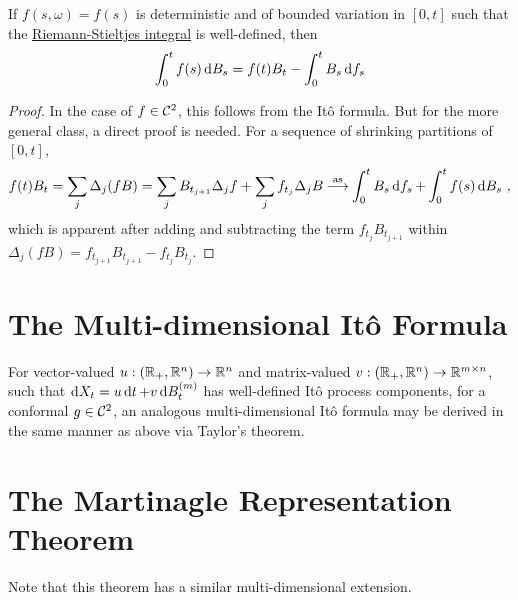 \documentclass{article}
\begin{document}
    \begin{theorem}
      If \(f(s,\omega)=f(s)\) is deterministic and of bounded variation in \([0,t]\) such that the \href{https://en.wikipedia.org/wiki/Riemann%E2%80%93Stieltjes_integral}{Riemann-Stieltjes integral} is well-defined, then
        \[
          \int_0^t f(s)\mathop{\mathrm{d} B_s }=f(t)B_t-\int_0^tB_s\mathop{\mathrm{d} f_s }
          \]
        \end{theorem}
        \begin{proof}
          In the case of \(f\in\mathcal{C}^2\), this follows from the It\^{o} formula. But for the more general class, a direct proof is needed. For a sequence of shrinking partitions of \([0, t]\),
          \[
            f(t)B_t=\sum_j\Delta_j(fB)=\sum_jB_{t_{j+1}}\Delta_j f+\sum_jf_{t_j}\Delta_j B\mathbin{\overset{\text{as}}{\longrightarrow}} \int_0^tB_s\mathop{\mathrm{d} f_s }+\int_0^t f(s)\mathop{\mathrm{d} B_s }\,\,,
          \]
          which is apparent after adding and subtracting the term \(f_{t_j}B_{t_{j+1}}\) within \(\Delta_j(fB)=f_{t_{j+1}}B_{t_{j+1}}-f_{t_{j}}B_{t_{j}}\).
          \end{proof}
          
\section{The Multi-dimensional It\^{o} Formula}

For vector-valued \(u:(\mathbb{R}_+,\mathbb{R}^n)\rightarrow\mathbb{R}^n\) and matrix-valued \(v:(\mathbb{R}_+,\mathbb{R}^n)\rightarrow\mathbb{R}^{m\times n}\), such that \(\mathop{\mathrm{d} X_t }=u\mathop{\mathrm{d} t }+v\mathop{\mathrm{d} B_t^{(m)} }\) has well-defined It\^{o} process components, for a conformal \(g\in\mathcal{C}^2\), an analogous multi-dimensional It\^{o} formula may be derived in the same manner as above via Taylor's theorem.

\section{The Martinagle Representation Theorem}

Note that this theorem has a similar multi-dimensional extension.
\end{document}
